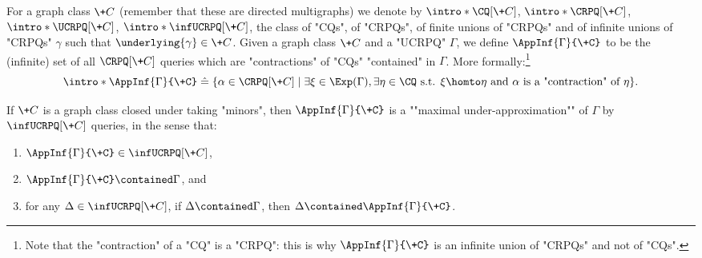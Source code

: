 For a graph class $\+C$ (remember that these are directed multigraphs) we denote by \AP$\intro*\CQ[\+C]$, $\intro*\CRPQ[\+C]$, $\intro*\UCRPQ[\+C]$, $\intro*\infUCRPQ[\+C]$, the class of "CQs", of "CRPQs", of finite unions of "CRPQs" 
and of infinite unions of "CRPQs" $\gamma$ such that $\underlying{\gamma} \in \+C$.
Given a graph class $\+C$ and a "UCRPQ" $\Gamma$, we define $\AppInf{\Gamma}{\+C}$ to be the (infinite) set of all $\CRPQ[\+C]$ queries which are "contractions" of "CQs" "contained" in $\Gamma$. More formally:\footnote[][-4em]{Note that the "contraction" of a "CQ" is a "CRPQ": this is why $\AppInf{\Gamma}{\+C}$ is an infinite union of "CRPQs" and not of "CQs".}
\[
	\intro*\AppInf{\Gamma}{\+C} \defeq \{
		\alpha \in \CRPQ[\+C] \mid \exists \xi \in \Exp(\Gamma), \exists \eta \in \CQ \text{ s.t. }
		\xi \homto \eta \text{ and } \alpha \text{ is a "contraction" of } \eta
	\}.
\]
\begin{proposition}
	\AP\label{prop:max-under-approx}
	If $\+C$ is a graph class closed under taking "minors", then
	$\AppInf{\Gamma}{\+C}$ is a \AP""maximal under-approximation"" of $\Gamma$ by $\infUCRPQ[\+C]$ queries, in the sense that:
	\begin{enumerate}
		\item $\AppInf{\Gamma}{\+C} \in \infUCRPQ[\+C]$,
		\item $\AppInf{\Gamma}{\+C} \contained \Gamma$, and
		\item for any $\Delta \in \infUCRPQ[\+C]$, if $\Delta \contained \Gamma$, then $\Delta \contained \AppInf{\Gamma}{\+C}$.
	\end{enumerate}
\end{proposition}

